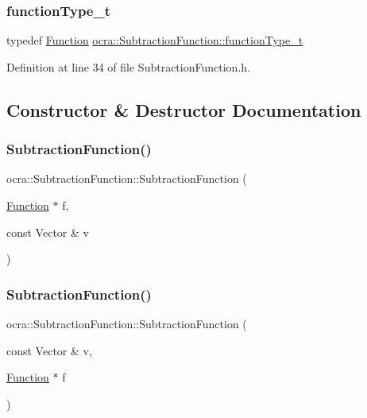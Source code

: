 \subsubsection{\texorpdfstring{function\+Type\+\_\+t}{functionType\_t}}
{\footnotesize\ttfamily typedef \hyperlink{classocra_1_1Function}{Function} \hyperlink{classocra_1_1SubtractionFunction_a371966d5def8140a019099fc4346f413}{ocra\+::\+Subtraction\+Function\+::function\+Type\+\_\+t}}



Definition at line 34 of file Subtraction\+Function.\+h.



\subsection{Constructor \& Destructor Documentation}
\hypertarget{classocra_1_1SubtractionFunction_a65b777d9cbd05c1e14063fd0bb99f262}{}\label{classocra_1_1SubtractionFunction_a65b777d9cbd05c1e14063fd0bb99f262} 
\subsubsection{\texorpdfstring{Subtraction\+Function()}{SubtractionFunction()}\hspace{0.1cm}{\footnotesize\ttfamily [1/2]}}
{\footnotesize\ttfamily ocra\+::\+Subtraction\+Function\+::\+Subtraction\+Function (\begin{DoxyParamCaption}\item[{\hyperlink{classocra_1_1Function}{Function} $\ast$}]{f,  }\item[{const Vector \&}]{v }\end{DoxyParamCaption})}

\hypertarget{classocra_1_1SubtractionFunction_ab825dea759ffedcdd1c30b19e1df02f1}{}\label{classocra_1_1SubtractionFunction_ab825dea759ffedcdd1c30b19e1df02f1} 
\subsubsection{\texorpdfstring{Subtraction\+Function()}{SubtractionFunction()}\hspace{0.1cm}{\footnotesize\ttfamily [2/2]}}
{\footnotesize\ttfamily ocra\+::\+Subtraction\+Function\+::\+Subtraction\+Function (\begin{DoxyParamCaption}\item[{const Vector \&}]{v,  }\item[{\hyperlink{classocra_1_1Function}{Function} $\ast$}]{f }\end{DoxyParamCaption})}

